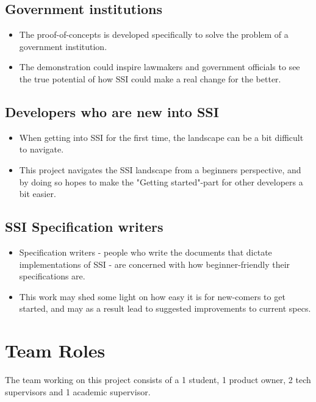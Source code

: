 \subsection{Government institutions}

\begin{itemize}
\item The proof-of-concepts is developed specifically to solve the problem of a government institution.
\item The demonstration could inspire lawmakers and government officials to see the true potential of how SSI could make a real change for the better.
\end{itemize}

\subsection{Developers who are new into SSI}
\begin{itemize}
\item When getting into SSI for the first time, the landscape can be a bit difficult to navigate.
\item This project navigates the SSI landscape from a beginners perspective, and by doing so hopes to make the "Getting started"-part for other developers a bit easier.
\end{itemize}

\subsection{SSI Specification writers}
\begin{itemize}
\item Specification writers - people who write the documents that dictate implementations of SSI - are concerned with how beginner-friendly their specifications are.
\item This work may shed some light on how easy it is for new-comers to get started, and may as a result lead to suggested improvements to current specs.
\end{itemize}



\section{Team Roles}

The team working on this project consists of a 1 student, 1 product owner, 2 tech supervisors and 1 academic supervisor.

